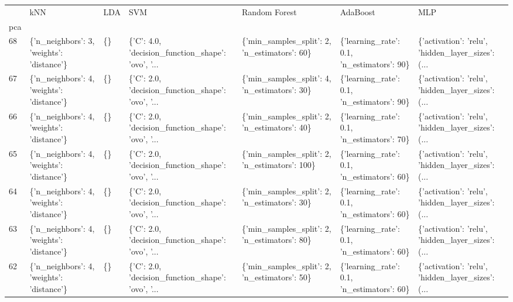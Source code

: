 \begin{tabular}{lllllll}
\toprule
{} &                                        kNN & LDA &                                                SVM &                                  Random Forest &                                    AdaBoost &                                                MLP \\
pca &                                            &     &                                                    &                                                &                                             &                                                    \\
\midrule
68  &  \{'n\_neighbors': 3, 'weights': 'distance'\} &  \{\} &  \{'C': 4.0, 'decision\_function\_shape': 'ovo', '... &   \{'min\_samples\_split': 2, 'n\_estimators': 60\} &  \{'learning\_rate': 0.1, 'n\_estimators': 90\} &  \{'activation': 'relu', 'hidden\_layer\_sizes': (... \\
67  &  \{'n\_neighbors': 4, 'weights': 'distance'\} &  \{\} &  \{'C': 2.0, 'decision\_function\_shape': 'ovo', '... &   \{'min\_samples\_split': 4, 'n\_estimators': 30\} &  \{'learning\_rate': 0.1, 'n\_estimators': 90\} &  \{'activation': 'relu', 'hidden\_layer\_sizes': (... \\
66  &  \{'n\_neighbors': 4, 'weights': 'distance'\} &  \{\} &  \{'C': 2.0, 'decision\_function\_shape': 'ovo', '... &   \{'min\_samples\_split': 2, 'n\_estimators': 40\} &  \{'learning\_rate': 0.1, 'n\_estimators': 70\} &  \{'activation': 'relu', 'hidden\_layer\_sizes': (... \\
65  &  \{'n\_neighbors': 4, 'weights': 'distance'\} &  \{\} &  \{'C': 2.0, 'decision\_function\_shape': 'ovo', '... &  \{'min\_samples\_split': 2, 'n\_estimators': 100\} &  \{'learning\_rate': 0.1, 'n\_estimators': 60\} &  \{'activation': 'relu', 'hidden\_layer\_sizes': (... \\
64  &  \{'n\_neighbors': 4, 'weights': 'distance'\} &  \{\} &  \{'C': 2.0, 'decision\_function\_shape': 'ovo', '... &   \{'min\_samples\_split': 2, 'n\_estimators': 30\} &  \{'learning\_rate': 0.1, 'n\_estimators': 60\} &  \{'activation': 'relu', 'hidden\_layer\_sizes': (... \\
63  &  \{'n\_neighbors': 4, 'weights': 'distance'\} &  \{\} &  \{'C': 2.0, 'decision\_function\_shape': 'ovo', '... &   \{'min\_samples\_split': 2, 'n\_estimators': 80\} &  \{'learning\_rate': 0.1, 'n\_estimators': 60\} &  \{'activation': 'relu', 'hidden\_layer\_sizes': (... \\
62  &  \{'n\_neighbors': 4, 'weights': 'distance'\} &  \{\} &  \{'C': 2.0, 'decision\_function\_shape': 'ovo', '... &   \{'min\_samples\_split': 2, 'n\_estimators': 50\} &  \{'learning\_rate': 0.1, 'n\_estimators': 60\} &  \{'activation': 'relu', 'hidden\_layer\_sizes': (... \\

\end{tabular}
